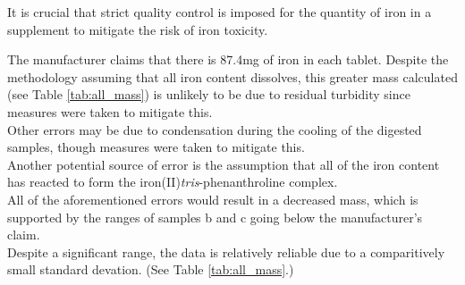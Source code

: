 \documentclass[main.tex]{subfiles}
\begin{document}
It is crucial that strict quality control is imposed for the quantity of iron in a supplement to mitigate the risk of iron toxicity.

The manufacturer claims that there is 87.4mg of iron in each tablet. Despite the methodology assuming that all iron content dissolves, this greater mass calculated (see Table \ref{tab:all_mass}) is unlikely to be due to residual turbidity since measures were taken to mitigate this.
\\
Other errors may be due to condensation during the cooling of the digested samples, though measures were taken to mitigate this.
\\
Another potential source of error is the assumption that all of the iron content has reacted to form the iron(II)\textit{tris}-phenanthroline complex.
\\
All of the aforementioned errors would result in a decreased mass, which is supported by the ranges of samples b and c going below the manufacturer's claim.
\\
Despite a significant range, the data is relatively reliable due to a comparitively small standard devation. (See Table \ref{tab:all_mass}.) 
\\
\end{document}
